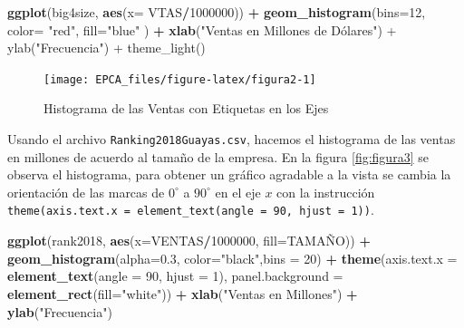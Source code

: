 \documentclass[letterpaper,]{book}
\newenvironment{Shaded}{\begin{snugshade}}{\end{snugshade}}
\newcommand{\DataTypeTok}[1]{\textcolor[rgb]{0.13,0.29,0.53}{#1}}
\newcommand{\DecValTok}[1]{\textcolor[rgb]{0.00,0.00,0.81}{#1}}
\newcommand{\FloatTok}[1]{\textcolor[rgb]{0.00,0.00,0.81}{#1}}
\newcommand{\KeywordTok}[1]{\textcolor[rgb]{0.13,0.29,0.53}{\textbf{#1}}}
\newcommand{\NormalTok}[1]{#1}
\newcommand{\OperatorTok}[1]{\textcolor[rgb]{0.81,0.36,0.00}{\textbf{#1}}}
\newcommand{\StringTok}[1]{\textcolor[rgb]{0.31,0.60,0.02}{#1}}
\begin{document}
\begin{Shaded}
\begin{Highlighting}[]
\KeywordTok{ggplot}\NormalTok{(big4size, }\KeywordTok{aes}\NormalTok{(}\DataTypeTok{x=}\NormalTok{ VTAS}\OperatorTok{/}\DecValTok{1000000}\NormalTok{)) }\OperatorTok{+}\StringTok{ }
\StringTok{  }\KeywordTok{geom_histogram}\NormalTok{(}\DataTypeTok{bins=}\DecValTok{12}\NormalTok{, }\DataTypeTok{color=} \StringTok{"red"}\NormalTok{,  }\DataTypeTok{fill=}\StringTok{"blue"}\NormalTok{ ) }\OperatorTok{+}\StringTok{ }
\StringTok{  }\KeywordTok{xlab}\NormalTok{(}\StringTok{"Ventas en Millones de Dólares") + ylab("}\NormalTok{Frecuencia}\StringTok{") +}
\StringTok{  theme_light()}
\end{Highlighting}
\end{Shaded}

\begin{figure}[h!]

{\centering \texttt{[image: EPCA\_files/figure-latex/figura2-1]} 

}

\caption{Histograma de las Ventas con Etiquetas en los Ejes}\label{fig:figura2}
\end{figure}

Usando el archivo \texttt{Ranking2018Guayas.csv}, hacemos el histograma de las ventas en millones de acuerdo al tamaño de la empresa. En la figura \ref{fig:figura3} se observa el histograma, para obtener un gráfico agradable a la vista se cambia la orientación de las marcas de \(0^\circ\) a \(90^\circ\) en el eje \(x\) con la instrucción \texttt{theme(axis.text.x\ =\ element\_text(angle\ =\ 90,\ hjust\ =\ 1))}.

\begin{Shaded}
\begin{Highlighting}[]
\KeywordTok{ggplot}\NormalTok{(rank2018, }\KeywordTok{aes}\NormalTok{(}\DataTypeTok{x=}\NormalTok{VENTAS}\OperatorTok{/}\DecValTok{1000000}\NormalTok{, }\DataTypeTok{fill=}\NormalTok{TAMAÑO)) }\OperatorTok{+}\StringTok{ }
\StringTok{  }\KeywordTok{geom_histogram}\NormalTok{(}\DataTypeTok{alpha=}\FloatTok{0.3}\NormalTok{, }\DataTypeTok{color=}\StringTok{"black"}\NormalTok{,}\DataTypeTok{bins =} \DecValTok{20}\NormalTok{) }\OperatorTok{+}
\StringTok{  }\KeywordTok{theme}\NormalTok{(}\DataTypeTok{axis.text.x =} \KeywordTok{element_text}\NormalTok{(}\DataTypeTok{angle =} \DecValTok{90}\NormalTok{, }\DataTypeTok{hjust =} \DecValTok{1}\NormalTok{), }
        \DataTypeTok{panel.background =} \KeywordTok{element_rect}\NormalTok{(}\DataTypeTok{fill=}\StringTok{"white"}\NormalTok{)) }\OperatorTok{+}
\StringTok{  }\KeywordTok{xlab}\NormalTok{(}\StringTok{"Ventas en Millones"}\NormalTok{) }\OperatorTok{+}\StringTok{ }\KeywordTok{ylab}\NormalTok{(}\StringTok{"Frecuencia"}\NormalTok{) }
\end{Highlighting}
\end{Shaded}
\end{document}
